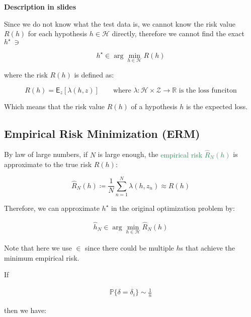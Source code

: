 \documentclass{article}
\begin{document}
\bigskip

\begin{center}
    \textbf{Description in slides}
\end{center}

Since we do not know what the test data is, 
we cannot know the risk value $R(h)$ for each hypothesis $h \in \mathcal{H}$ directly, 
therefore we cannot find the exact $h^\star \ \ni$

\begin{equation*}
    h^\star \in \arg\min_{h \in \mathcal{H}} R(h)
\end{equation*}

where the risk $R(h)$ is defined as:

\begin{equation*}
    R(h) = \mathsf{E}_z[\lambda(h, z)] \qquad \text{where } \lambda:\mathcal{H} \times \mathcal{Z} \rightarrow \mathbb{R} \text{ is the loss funciton}
\end{equation*}

Which means that the risk value $R(h)$ of a hypothesis $h$ is the expected loss.
\bigskip

\subsection*{Empirical Risk Minimization (ERM)}

By law of large numbers, if $N$ is large enough, 
the \textcolor{SeaGreen}{empirical risk $\hat{R}_N(h)$} is approximate to the true risk $R(h)$:

\begin{equation*}
    \hat{R}_N(h) \coloneqq \frac{1}{N} \sum_{n=1}^N \lambda(h, z_n) \approx R(h)
\end{equation*}

Therefore, we can approximate $h^\star$ in the original optimization problem by:

\begin{align*}
    \hat{h}_N \in \arg\min_{h \in \mathcal{H}} \hat{R}_N(h)
\end{align*}

Note that here we use $\in$ since there could be multiple $h$s that achieve the minimum empirical risk.

If

\begin{align*}
    \mathbb{P}\{\delta = \delta_i\} \sim \frac{1}{n}
\end{align*}

then we have:
\end{document}

